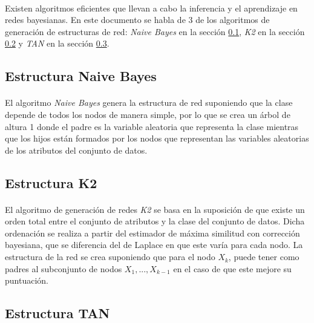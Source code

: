 \documentclass{article}
\begin{document}
		\paragraph{}
		Existen algoritmos eficientes que llevan a cabo la inferencia y el aprendizaje en redes bayesianas. En este documento se habla de 3 de los algoritmos de generación de estructuras de red: \emph{Naive Bayes} en la sección \ref{sec:structure_naive}, \emph{K2} en la sección \ref{sec:structure_K2} y \emph{TAN} en la sección \ref{sec:structure_tan}.

		\subsection{Estructura Naive Bayes}
		\label{sec:structure_naive}

			\paragraph{}
			El algoritmo \emph{Naive Bayes} genera la estructura de red suponiendo que la clase depende de todos los nodos de manera simple, por lo que se crea un árbol de altura 1 donde el padre es la variable aleatoria que representa la clase mientras que los hijos están formados por los nodos que representan las variables aleatorias de los atributos del conjunto de datos.

		\subsection{Estructura K2}
		\label{sec:structure_K2}

			\paragraph{}
			El algoritmo de generación de redes \emph{K2} se basa en la suposición de que existe un orden total entre el conjunto de atributos y la clase del conjunto de datos. Dicha ordenación se realiza a partir del estimador de máxima similitud con corrección bayesiana, que se diferencia del de Laplace en que este varía para cada nodo. La estructura de la red se crea suponiendo que para el nodo $X_k$, puede tener como padres al subconjunto de nodos $X_1,...,X_{k-1}$ en el caso de que este mejore su puntuación.

		\subsection{Estructura TAN}
		\label{sec:structure_tan}
\end{document}
